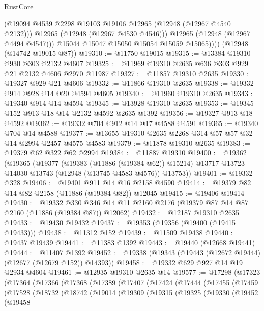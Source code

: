 \begin{lexlean}{RustCore}
\begin{coremodule}
                (@19094 @4539 @2298 @19103 @19106 @12965 (@12948 (@12967 @4540 @2132)))
                @12965
                (@12948 (@12967 @4530 @4546)))
              @12965
              (@12948 (@12967 @4494 @4547)))
            @15044
            @15047
            @15050
            @15054
            @15059
            @15065))))
    (@12948 (@14742 @19015 @87))
@19310 := @11750 @19015
@19315 := @13384 @19310 @930 @303 @2132 @4607
@19325 := @11969 @19310 @2635 @636 @303 @929 @21 @2132 @4606 @2970 @11987
@19327 := @11857 @19310 @2635
@19330 := @19327 @929 @21 @4606
@19332 := @11866 @19310 @2635
@19338 := @19332 @914 @928 @14 @20 @4594 @4605
@19340 := @11960 @19310 @2635
@19343 := @19340 @914 @14 @4594
@19345 := @13928 @19310 @2635
@19353 := @19345 @152 @913 @18 @14 @2132 @4592 @2635 @1392
@19356 := @19327 @913 @18 @4592
@19362 := @19332 @704 @912 @14 @17 @4588 @4591
@19365 := @19340 @704 @14 @4588
@19377 := @13655 @19310 @2635 @2268 @314 @57 @57 @32 @14 @2994 @2457 @4575 @4583
@19379 := @11878 @19310 @2635
@19383 := @19379 @62 @322 @62 @2994
@19384 := @11887 @19310
@19400 := @19362
    (@19365
      (@19377
        (@19383 (@11886 (@19384 @62)) @15214)
        @13717
        @13723
        @14030
        @13743
        (@12948 (@13745 @4583 @4576))
        @13753))
@19401 := @19332 @328
@19406 := @19401 @911 @14 @16 @2158 @4590
@19414 := @19379 @82 @14 @82 @2158 (@11886 (@19384 @82)) @12045
@19415 := @19406 @19414
@19430 := @19332
    @330
    @346
    @14
    @11
    @2160
    @2176
    (@19379 @87 @14 @87 @2160 (@11886 (@19384 @87)) @12062)
@19432 := @12187 @19310 @2635
@19433 := @19430 @19432
@19437 := @19353 (@19356 (@19400 (@19415 @19433)))
@19438 := @11312 @152
@19439 := @11509 @19438
@19440 := @19437 @19439
@19441 := @11383 @1392
@19443 := @19440 (@12668 @19441)
@19444 := @11407 @1392
@19452 := @19338 (@19343 (@19443 (@12672 @19444) (@12677 (@12679 @152)) @14393))
@19458 := @19332 @629 @927 @14 @19 @2934 @4604
@19461 := @12935 @19310 @2635 @14
@19577 := @17298
    (@17323
      (@17364
        (@17366
          (@17368
            (@17389
              (@17407
                (@17424
                  (@17444
                    (@17455
                      (@17459
                        (@17528
                          (@18732
                            (@18742
                              (@19014
                                (@19309
                                  (@19315
                                    (@19325
                                      (@19330
                                        (@19452
                                          (@19458

\end{coremodule}
\end{lexlean}

